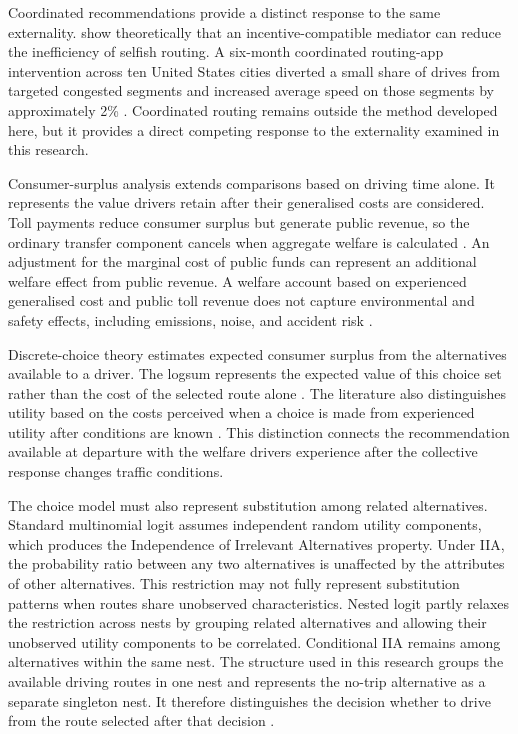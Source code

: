 \documentclass{article}
\begin{document}
Coordinated recommendations provide a distinct response to the same externality. \Textcite{vassermanEtAl2015} show theoretically that an incentive-compatible mediator can reduce the inefficiency of selfish routing. A six-month coordinated routing-app intervention across ten United States cities diverted a small share of drives from targeted congested segments and increased average speed on those segments by approximately 2\% \parencite{aroraEtAl2026}. Coordinated routing remains outside the method developed here, but it provides a direct competing response to the externality examined in this research.

Consumer-surplus analysis extends comparisons based on driving time alone. It represents the value drivers retain after their generalised costs are considered. Toll payments reduce consumer surplus but generate public revenue, so the ordinary transfer component cancels when aggregate welfare is calculated \parencite{ferrari2002}. An adjustment for the marginal cost of public funds can represent an additional welfare effect from public revenue. A welfare account based on experienced generalised cost and public toll revenue does not capture environmental and safety effects, including emissions, noise, and accident risk \parencite{rouwendalVerhoef2006}.

Discrete-choice theory estimates expected consumer surplus from the alternatives available to a driver. The logsum represents the expected value of this choice set rather than the cost of the selected route alone \parencite{williams1977,smallRosen1981,deJongEtAl2007}. The literature also distinguishes utility based on the costs perceived when a choice is made from experienced utility after conditions are known \parencite{chorusTimmermans2009,chorusDeJong2011}. This distinction connects the recommendation available at departure with the welfare drivers experience after the collective response changes traffic conditions.

The choice model must also represent substitution among related alternatives. Standard multinomial logit assumes independent random utility components, which produces the Independence of Irrelevant Alternatives property. Under IIA, the probability ratio between any two alternatives is unaffected by the attributes of other alternatives. This restriction may not fully represent substitution patterns when routes share unobserved characteristics. Nested logit partly relaxes the restriction across nests by grouping related alternatives and allowing their unobserved utility components to be correlated. Conditional IIA remains among alternatives within the same nest. The structure used in this research groups the available driving routes in one nest and represents the no-trip alternative as a separate singleton nest. It therefore distinguishes the decision whether to drive from the route selected after that decision \parencite{benAkivaBierlaire1999}.
\end{document}
